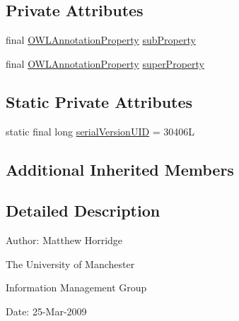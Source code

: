 \subsection*{Private Attributes}
\begin{DoxyCompactItemize}
\item 
final \hyperlink{interfaceorg_1_1semanticweb_1_1owlapi_1_1model_1_1_o_w_l_annotation_property}{O\-W\-L\-Annotation\-Property} \hyperlink{classuk_1_1ac_1_1manchester_1_1cs_1_1owl_1_1owlapi_1_1_o_w_l_sub_annotation_property_of_axiom_impl_aa791ca971225ae2beb52227d8915c30a}{sub\-Property}
\item 
final \hyperlink{interfaceorg_1_1semanticweb_1_1owlapi_1_1model_1_1_o_w_l_annotation_property}{O\-W\-L\-Annotation\-Property} \hyperlink{classuk_1_1ac_1_1manchester_1_1cs_1_1owl_1_1owlapi_1_1_o_w_l_sub_annotation_property_of_axiom_impl_ae0aeabf69e211c20a9e4e01244e3aa22}{super\-Property}
\end{DoxyCompactItemize}
\subsection*{Static Private Attributes}
\begin{DoxyCompactItemize}
\item 
static final long \hyperlink{classuk_1_1ac_1_1manchester_1_1cs_1_1owl_1_1owlapi_1_1_o_w_l_sub_annotation_property_of_axiom_impl_adb6bff6076449a4f7edf823e371fda66}{serial\-Version\-U\-I\-D} = 30406\-L
\end{DoxyCompactItemize}
\subsection*{Additional Inherited Members}


\subsection{Detailed Description}
Author\-: Matthew Horridge\par
 The University of Manchester\par
 Information Management Group\par
 Date\-: 25-\/\-Mar-\/2009 

